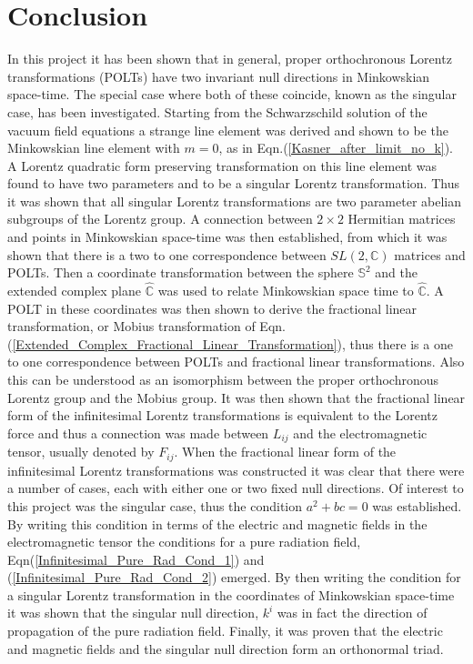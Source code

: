 \section{Conclusion}

In this project it has been shown that in general, proper orthochronous Lorentz transformations (POLTs) have two invariant null directions in Minkowskian space-time. The special case where both of these coincide, known as the singular case, has been investigated. Starting from the Schwarzschild solution of the vacuum field equations a strange line element was derived and shown to be the Minkowskian line element with $m = 0$, as in Eqn.(\ref{Kasner_after_limit_no_k}). A Lorentz quadratic form preserving transformation on this line element was found to have two parameters and to be a singular Lorentz transformation. Thus it was shown that all singular Lorentz transformations are two parameter abelian subgroups of the Lorentz group. A connection between $2 \times 2$ Hermitian matrices and points in Minkowskian space-time was then established, from which it was shown that there is a two to one correspondence between $SL(2,\mathbb{C})$ matrices and POLTs. Then a coordinate transformation between the sphere $\mathbb{S}^2$ and the extended complex plane $\hat{\mathbb{C}}$ was used to relate Minkowskian space time to $\hat{\mathbb{C}}$. A POLT in these coordinates was then shown to derive the fractional linear transformation, or Mobius transformation of Eqn.(\ref{Extended_Complex_Fractional_Linear_Transformation}), thus there is a one to one correspondence between POLTs and fractional linear transformations. Also this can be understood as an isomorphism between the proper orthochronous Lorentz group and the Mobius group. It was then shown that the fractional linear form of the infinitesimal Lorentz transformations is equivalent to the Lorentz force and thus a connection was made between $L_{ij}$ and the electromagnetic tensor, usually denoted by $F_{ij}$. When the fractional linear form of the infinitesimal Lorentz transformations was constructed it was clear that there were a number of cases, each with either one or two fixed null directions. Of interest to this project was the singular case, thus the condition $a^2 + bc = 0$ was established. By writing this condition in terms of the electric and magnetic fields in the electromagnetic tensor the conditions for a pure radiation field, Eqn(\ref{Infinitesimal_Pure_Rad_Cond_1}) and (\ref{Infinitesimal_Pure_Rad_Cond_2}) emerged. By then writing the condition for a singular Lorentz transformation in the coordinates of Minkowskian space-time it was shown that the singular null direction, $k^i$ was in fact the direction of propagation of the pure radiation field. Finally, it was proven that the electric and magnetic fields and the singular null direction form an orthonormal triad.     
